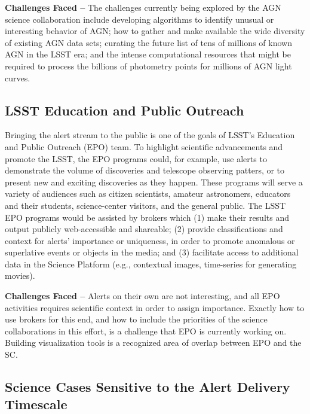 {\bf Challenges Faced --} The challenges currently being explored by the AGN science collaboration include developing algorithms to identify unusual or interesting behavior of AGN; how to gather and make available the wide diversity of existing AGN data sets; curating the future list of tens of millions of known AGN in the LSST era; and the intense computational resources that might be required to process the billions of photometry points for millions of AGN light curves.

\subsection{LSST Education and Public Outreach}\label{ssec:sci_epo}

Bringing the alert stream to the public is one of the goals of LSST's Education and Public Outreach (EPO) team. To highlight scientific advancements and promote the LSST, the EPO programs could, for example, use alerts to demonstrate the volume of discoveries and telescope observing patters, or to present new and exciting discoveries as they happen. These programs will serve a variety of audiences such as citizen scientists, amateur astronomers, educators and their students, science-center visitors, and the general public. The LSST EPO programs would be assisted by brokers which (1) make their results and output publicly web-accessible and shareable; (2) provide classifications and context for alerts' importance or uniqueness, in order to promote anomalous or superlative events or objects in the media; and (3) facilitate access to additional data in the Science Platform (e.g., contextual images, time-series for generating movies).

{\bf Challenges Faced --} Alerts on their own are not interesting, and all EPO activities requires scientific context in order to assign importance. Exactly how to use brokers for this end, and how to include the priorities of the science collaborations in this effort, is a challenge that EPO is currently working on. Building visualization tools is a recognized area of overlap between EPO and the SC.



\subsection{Science Cases Sensitive to the Alert Delivery Timescale}

